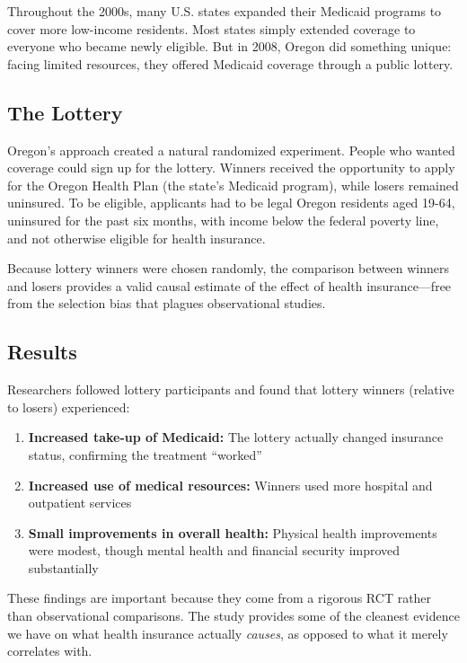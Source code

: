 \documentclass[
  letterpaper,
  DIV=11,
  numbers=noendperiod]{scrreprt}
\providecommand{\tightlist}{%
  \setlength{\itemsep}{0pt}\setlength{\parskip}{0pt}}
\begin{document}
Throughout the 2000s, many U.S. states expanded their Medicaid programs
to cover more low-income residents. Most states simply extended coverage
to everyone who became newly eligible. But in 2008, Oregon did something
unique: facing limited resources, they offered Medicaid coverage through
a public lottery.

\subsection{The Lottery}\label{the-lottery}

Oregon's approach created a natural randomized experiment. People who
wanted coverage could sign up for the lottery. Winners received the
opportunity to apply for the Oregon Health Plan (the state's Medicaid
program), while losers remained uninsured. To be eligible, applicants
had to be legal Oregon residents aged 19-64, uninsured for the past six
months, with income below the federal poverty line, and not otherwise
eligible for health insurance.

Because lottery winners were chosen randomly, the comparison between
winners and losers provides a valid causal estimate of the effect of
health insurance---free from the selection bias that plagues
observational studies.

\subsection{Results}\label{results}

Researchers followed lottery participants and found that lottery winners
(relative to losers) experienced:

\begin{enumerate}
\def\labelenumi{\arabic{enumi}.}
\tightlist
\item
  \textbf{Increased take-up of Medicaid:} The lottery actually changed
  insurance status, confirming the treatment ``worked''
\item
  \textbf{Increased use of medical resources:} Winners used more
  hospital and outpatient services
\item
  \textbf{Small improvements in overall health:} Physical health
  improvements were modest, though mental health and financial security
  improved substantially
\end{enumerate}

These findings are important because they come from a rigorous RCT
rather than observational comparisons. The study provides some of the
cleanest evidence we have on what health insurance actually
\emph{causes}, as opposed to what it merely correlates with.
\end{document}
